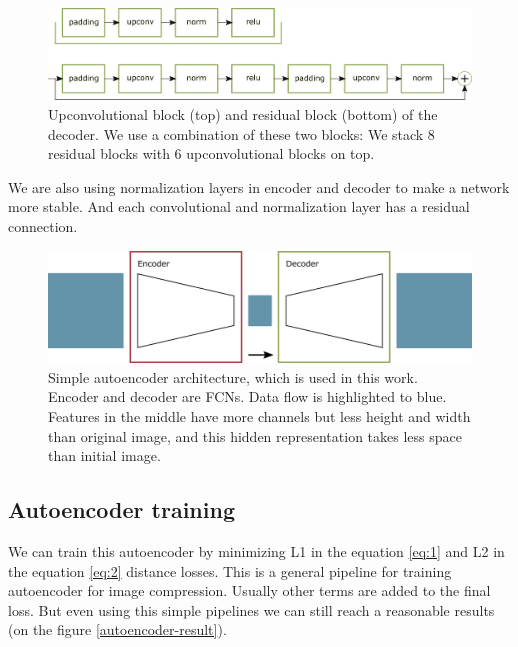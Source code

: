 \begin{figure}[!ht]
    \centering
    \includegraphics[width=\textwidth]{figure/generator.png}
    \caption{Upconvolutional block (top) and residual block (bottom) of the decoder. We use a combination of these two blocks: We stack 8 residual blocks with 6 upconvolutional blocks on top.}
    \label{decoder}
\end{figure}

We are also using normalization layers in encoder and decoder to make a network more stable. And each convolutional and normalization layer has a residual connection.

\begin{figure}[!ht]
    \centering
    \includegraphics[width=\textwidth]{figure/general-autoencoder.png}
    \caption{Simple autoencoder architecture, which is used in this work. Encoder and decoder are FCNs. Data flow is highlighted to blue. Features in the middle have more channels but less height and width than original image, and this hidden representation takes less space than initial image.}
    \label{autoencoder}
\end{figure}

\subsection{Autoencoder training}

We can train this autoencoder by minimizing L1 in the equation \ref{eq:1} and L2 in the equation \ref{eq:2} distance losses. This is a general pipeline for training autoencoder for image compression. Usually other terms are added to the final loss. But even using this simple pipelines we can still reach a reasonable results (on the figure \ref{autoencoder-result}).

